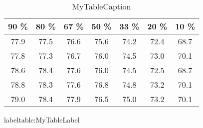                                         
\begin{table}                                           
\centering                                              
\begin{tabular}{|c|c|c|c|c|c|c|}                        
\hline                                                  
90 \% & 80 \% & 67 \% & 50 \% & 33 \% & 20 \% & 10 \% \\
\hline                                                  
77.9 & 77.5 & 76.6 & 75.6 & 74.2 & 72.4 & 68.7 \\       
\hline                                                  
77.8 & 77.3 & 76.7 & 76.0 & 74.5 & 73.0 & 70.1 \\       
\hline                                                  
78.6 & 78.4 & 77.6 & 76.0 & 74.5 & 72.5 & 68.7 \\       
\hline                                                  
78.8 & 78.3 & 77.6 & 76.8 & 74.8 & 73.2 & 70.1 \\       
\hline                                                  
79.0 & 78.4 & 77.9 & 76.5 & 75.0 & 73.2 & 70.1 \\       
\hline                                                  
\end{tabular}                                           
\caption{MyTableCaption}                                
label{table:MyTableLabel}                              
\end{table}                                             
